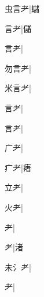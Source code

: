 \begin{multicols}{2}
{{\cjk{}虫言耂}\mktsJzrVerticalBar{}{\cjk{}{\cnsym{}　}{\cnsym{}　}{\cnsym{}　}}|{\cjk{}蠩}\par
{言耂}\mktsJzrVerticalBar{}{\cjk{}{\cnsym{}　}{\cnsym{}　}{\cnsym{}　}}|{\cjk{}儲}\par
{言耂}|{}\par
{\cjk{}勿言耂}\mktsJzrVerticalBar{}{\cjk{}{\cnsym{}　}{\cnsym{}　}{\cnsym{}　}}|{}\par
{\cjk{}米言耂}\mktsJzrVerticalBar{}{\cjk{}{\cnsym{}　}{\cnsym{}　}{\cnsym{}　}}|{}\par
{言耂}\mktsJzrVerticalBar{}{\cjk{}{\cnsym{}　}{\cnsym{}　}{\cnsym{}　}}|{}\par
{言耂}\mktsJzrVerticalBar{}{\cjk{}{\cnsym{}　}{\cnsym{}　}{\cnsym{}　}}|{}\par
{\cjk{}{\cnsym{}　}广耂}\mktsJzrVerticalBar{}{\cjk{}{\cnsym{}　}{\cnsym{}　}{\cnsym{}　}}|{}\par
{\cjk{}{\cnsym{}　}疒耂}\mktsJzrVerticalBar{}{\cjk{}{\cnsym{}　}{\cnsym{}　}{\cnsym{}　}}|{\cjk{}瘏}\par
{\cjk{}{\cnsym{}　}立耂}\mktsJzrVerticalBar{}{\cjk{}{\cnsym{}　}{\cnsym{}　}{\cnsym{}　}}|{}\par
{\cjk{}{\cnsym{}　}火耂}\mktsJzrVerticalBar{}{\cjk{}{\cnsym{}　}{\cnsym{}　}{\cnsym{}　}}|{}\par
{耂}\mktsJzrVerticalBar{}{\cjk{}{\cnsym{}　}{\cnsym{}　}{\cnsym{}　}}|{}\par
{耂}\mktsJzrVerticalBar{}{\cjk{}{\cnsym{}　}{\cnsym{}　}{\cnsym{}　}}|{\cjk{}渚}\par
{\cjk{}未{\cnxHanaA{}氵}耂}\mktsJzrVerticalBar{}{\cjk{}{\cnsym{}　}{\cnsym{}　}{\cnsym{}　}}|{}\par
{耂}\mktsJzrVerticalBar{}{\cjk{}{\cnsym{}　}{\cnsym{}　}{\cnsym{}　}}|{}\par
}
\end{multicols}
